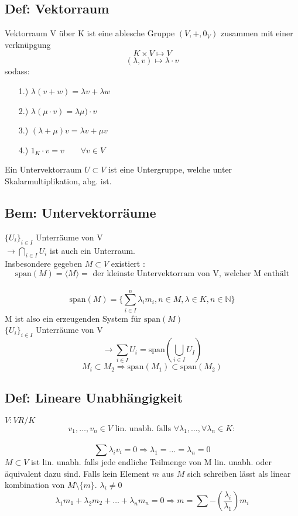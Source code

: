 \documentclass[titlepage,12pt,a4paper,ngerman]{report}
\newcommand{\tx}[1]{\textrm{#1}}
\newcommand{\spa}{\tx{span}}
\begin{document}

\subsection{Def: Vektorraum}
Vektorraum V über K ist eine ablesche Gruppe $(V,+,0_V)$ zusammen mit einer verknüpgung \\
$$ K \times V \mapsto V$$
$$(\lambda, v) \mapsto \lambda\cdot v$$
sodass:
\begin{itemize}
	\item[1.)] $\lambda(v+w) = \lambda v +\lambda w$
	\item[2.)] $\lambda(\mu \cdot v) = \lambda\mu) \cdot v$
	\item[3.)] $(\lambda + \mu) v = \lambda v + \mu v$
	\item[4.)] $ 1_K \cdot v = v \qquad\forall v \in V$
\end{itemize}

Ein Untervektorraum $U\subset V$ ist eine Untergruppe, welche unter Skalarmultiplikation, abg. ist.
\subsection{Bem: Untervektorräume} $\{U_i\}_{i\in I}$ Unterräume von V\\
$\rightarrow \bigcap_{i\in I} U_i$ ist auch ein Unterraum.\\
Insbesondere gegeben $M \subset V $ existiert :
$$\spa(M) = \langle M \rangle =\textrm{ der kleinste Untervektorram von V, welcher M enthält}$$\\
$$ \spa(M) = \{\sum^n_{i\in I} \lambda_i m_i, n\in M ,\lambda\in K, n\in \mathbb{N}\}$$
M ist also ein erzeugenden System für $\spa(M)$\\
$\{U_i\}_{i\in I}$ Unterräume von V\\
$$\rightarrow \sum_{i\in I} U_i = \spa (\bigcup_{i\in I} U_I)$$
$$M_i \subset M_2 \Rightarrow \spa(M_1) \subset \spa(M_2)$$
\subsection{Def: Lineare Unabhängigkeit}
$ V : VR/K$\\
$$v_1,\dots, v_n \in V\textrm{ lin. unabh. falls }\forall\lambda_1 , \dots ,\forall\lambda_n \in K: $$\\
$$\sum \lambda_i v_i= 0 \Rightarrow\lambda_1 =  \dots = \lambda_n = 0$$
$M \subset V$ ist lin. unabh. falls jede endliche Teilmenge von M lin. unabh. oder äquivalent dazu sind. Falls kein Element $m$ aus $M$ sich schreiben lässt als linear kombination von $M\setminus \{m \}$.
$\lambda_i \neq 0$\\
$$ \lambda_1 m_1 + \lambda_2m_2 + \dots + \lambda_n m_n = 0 \Rightarrow m = \sum - (\frac{\lambda_i}{\lambda_1}) m_i$$
\end{document}

